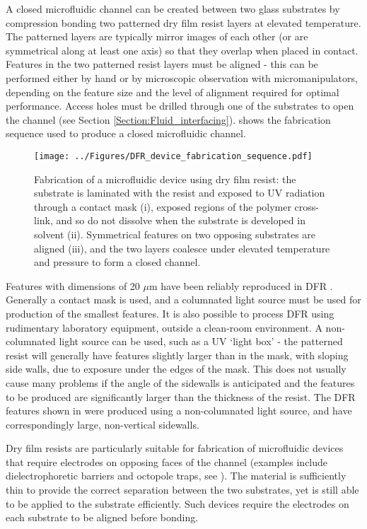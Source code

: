 A closed microfluidic channel can be created between two glass substrates by compression bonding two patterned dry film resist layers at elevated temperature. The patterned layers are typically mirror images of each other (or are symmetrical along at least one axis) so that they overlap when placed in contact. Features in the two patterned resist layers must be aligned - this can be performed either by hand or by microscopic observation with micromanipulators, depending on the feature size and the level of alignment required for optimal performance. Access holes must be drilled through one of the substrates to open the channel (see Section \ref{Section:Fluid_interfacing}).  shows the fabrication sequence used to produce a closed microfluidic channel.

\begin{figure}
	\centering
		\texttt{[image: ../Figures/DFR\_device\_fabrication\_sequence.pdf]}
	\caption[Fabrication of a microfluidic device using dry film resist.]{Fabrication of a microfluidic device using dry film resist: the substrate is laminated with the resist and exposed to UV radiation through a contact mask (i), exposed regions of the polymer cross-link, and so do not dissolve when the substrate is developed in solvent (ii). Symmetrical features on two opposing substrates are aligned (iii), and the two layers coalesce under elevated temperature and pressure to form a closed channel.}
	\label{fig:DFR_device_fabrication_sequence}
\end{figure}

Features with dimensions of 20 $\mu$m have been reliably reproduced in DFR \citep{Vulto:2005}. Generally a contact mask is used, and a columnated light source must be used for production of the smallest features. It is also possible to process DFR using rudimentary laboratory equipment, outside a clean-room environment. A non-columnated light source can be used, such as a UV `light box' - the patterned resist will generally have features slightly larger than in the mask, with sloping side walls, due to exposure under the edges of the mask. This does not usually cause many problems if the angle of the sidewalls is anticipated and the features to be produced are significantly larger than the thickness of the resist. The DFR features shown in  were produced using a non-columnated light source, and have correspondingly large, non-vertical sidewalls.

Dry film resists are particularly suitable for fabrication of microfluidic devices that require electrodes on opposing faces of the channel (examples include dielectrophoretic barriers and octopole traps, see ). The material is sufficiently thin to provide the correct separation between the two substrates, yet is still able to be applied to the substrate efficiently. Such devices require the electrodes on each substrate to be aligned before bonding.

